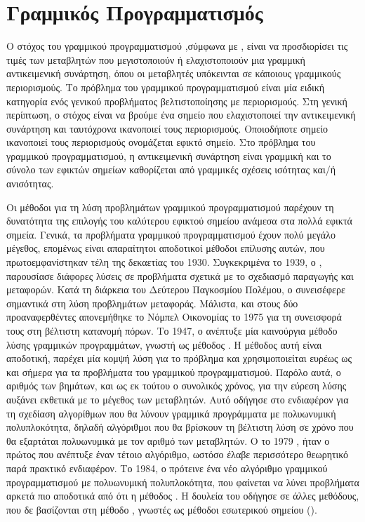 \chapter{Γραμμικός Προγραμματισμός}\label{ch:lp}
Ο στόχος του γραμμικού προγραμματισμού ,σύμφωνα με \cite{chong2010}, είναι να
προσδιορίσει τις τιμές των μεταβλητών που μεγιστοποιούν ή ελαχιστοποιούν μια γραμμική
αντικειμενική συνάρτηση, όπου οι μεταβλητές υπόκεινται σε κάποιους γραμμικούς περιορισμούς.
Το πρόβλημα του γραμμικού προγραμματισμού είναι μία ειδική κατηγορία ενός γενικού
προβλήματος βελτιστοποίησης με περιορισμούς. Στη γενική περίπτωση, ο στόχος είναι να βρούμε
ένα σημείο που ελαχιστοποιεί την αντικειμενική συνάρτηση και ταυτόχρονα ικανοποιεί τους περιορισμούς.
Οποιοδήποτε σημείο ικανοποιεί τους περιορισμούς ονομάζεται εφικτό σημείο. Στο πρόβλημα του γραμμικού
προγραμματισμού, η αντικειμενική συνάρτηση είναι γραμμική και το σύνολο των εφικτών σημείων καθορίζεται
από γραμμικές σχέσεις ισότητας και/ή ανισότητας.

Οι μέθοδοι για τη λύση προβλημάτων γραμμικού προγραμματισμού παρέχουν τη
δυνατότητα της επιλογής του καλύτερου εφικτού σημείου ανάμεσα στα πολλά εφικτά
σημεία. Γενικά, τα προβλήματα γραμμικού προγραμματισμού έχουν πολύ μεγάλο
μέγεθος, επομένως είναι απαραίτητοι αποδοτικοί μέθοδοι επίλυσης αυτών, που
πρωτοεμφανίστηκαν τέλη της δεκαετίας του 1930. Συγκεκριμένα το 1939, ο
 \cite{kantorovich1939}, παρουσίασε διάφορες λύσεις σε
προβλήματα σχετικά με το σχεδιασμό παραγωγής και μεταφορών. Κατά τη διάρκεια του
Δεύτερου Παγκοσμίου Πολέμου, ο  \cite{koopmans1949} συνεισέφερε
σημαντικά στη λύση προβλημάτων μεταφοράς. Μάλιστα, και στους δύο προαναφερθέντες
απονεμήθηκε το Νόμπελ Οικονομίας το 1975 για τη συνεισφορά τους στη βέλτιστη κατανομή
πόρων. Το 1947, ο  \cite{dantzig1963} ανέπτυξε μία καινούργια μέθοδο λύσης
γραμμικών προγραμμάτων, γνωστή ως μέθοδος . Η μέθοδος αυτή είναι αποδοτική, παρέχει
μία κομψή λύση για το πρόβλημα και χρησιμοποιείται ευρέως ως και σήμερα για τα προβλήματα
του γραμμικού προγραμματισμού. Παρόλο αυτά, ο αριθμός των βημάτων, και ως εκ
τούτου ο συνολικός χρόνος, για την εύρεση λύσης αυξάνει εκθετικά με το μέγεθος των μεταβλητών.
Αυτό οδήγησε στο ενδιαφέρον για τη σχεδίαση αλγορίθμων που θα λύνουν γραμμικά προγράμματα με
πολυωνυμική πολυπλοκότητα, δηλαδή αλγόριθμοι που θα βρίσκουν τη βέλτιστη λύση σε χρόνο που θα
εξαρτάται πολυωνυμικά με τον αριθμό των μεταβλητών. Ο  το 1979
\cite{khachiyan1979}, ήταν ο πρώτος που ανέπτυξε έναν τέτοιο αλγόριθμο, ωστόσο έλαβε
περισσότερο θεωρητικό παρά πρακτικό ενδιαφέρον. Το 1984, ο 
\cite{karmarkar1984} πρότεινε ένα νέο αλγόριθμο γραμμικού προγραμματισμού με
πολυωνυμική πολυπλοκότητα, που φαίνεται να λύνει προβλήματα αρκετά πιο αποδοτικά
από ότι η μέθοδος . Η δουλεία του  οδήγησε σε άλλες μεθόδους,
που δε βασίζονται στη μέθοδο , γνωστές ως μέθοδοι εσωτερικού σημείου
().

